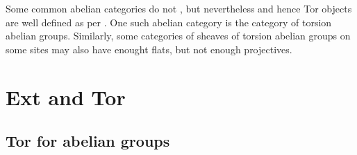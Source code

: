 


\begin{remark}
    Some common abelian categories do not , but nevertheless  and hence Tor objects are well defined as per . One such abelian category is the category of torsion abelian groups. Similarly, some categories of sheaves of torsion abelian groups on some sites may also have enought flats, but not enough projectives.
\end{remark}










 



 
\section{Ext and Tor}


\subsection{Tor for abelian groups}



